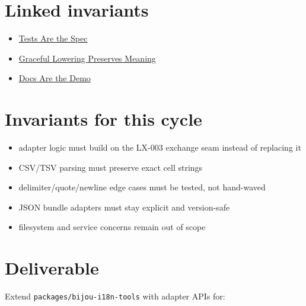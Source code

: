 \section{Linked invariants}\label{record-191-linked-invariants}

\begin{itemize}
\tightlist
\item
  \href{https://github.com/flyingrobots/bijou/blob/cbd70612140e7a450d764b3c7be1c6af878b99bc/docs/invariants/tests-are-the-spec.md}{Tests Are the Spec}
\item
  \href{https://github.com/flyingrobots/bijou/blob/cbd70612140e7a450d764b3c7be1c6af878b99bc/docs/invariants/graceful-lowering-preserves-meaning.md}{Graceful Lowering Preserves Meaning}
\item
  \href{https://github.com/flyingrobots/bijou/blob/cbd70612140e7a450d764b3c7be1c6af878b99bc/docs/invariants/docs-are-the-demo.md}{Docs Are the Demo}
\end{itemize}

\section{Invariants for this cycle}\label{record-191-invariants-for-this-cycle}

\begin{itemize}
\tightlist
\item
  adapter logic must build on the LX-003 exchange seam instead of replacing it
\item
  CSV/TSV parsing must preserve exact cell strings
\item
  delimiter/quote/newline edge cases must be tested, not hand-waved
\item
  JSON bundle adapters must stay explicit and version-safe
\item
  filesystem and service concerns remain out of scope
\end{itemize}

\section{Deliverable}\label{record-191-deliverable}

Extend \texttt{p\allowbreak{}a\allowbreak{}c\allowbreak{}k\allowbreak{}a\allowbreak{}g\allowbreak{}e\allowbreak{}s\allowbreak{}/\allowbreak{}b\allowbreak{}i\allowbreak{}j\allowbreak{}o\allowbreak{}u\allowbreak{}-\allowbreak{}i\allowbreak{}1\allowbreak{}8\allowbreak{}n\allowbreak{}-\allowbreak{}t\allowbreak{}o\allowbreak{}o\allowbreak{}l\allowbreak{}s} with adapter APIs for:

